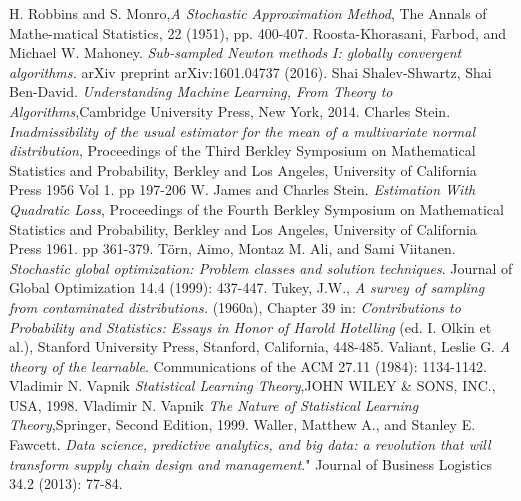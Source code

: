 \documentclass{book}
\theoremstyle{plain}
\theoremstyle{definition}
\theoremstyle{remark}
\begin{document}
\begin{thebibliography}{9}
H. Robbins and S. Monro,\emph{A  Stochastic  Approximation  Method}, The Annals of Mathe-matical Statistics, 22 (1951), pp. 400-407.
Roosta-Khorasani, Farbod, and Michael W. Mahoney. \emph{Sub-sampled Newton methods I: globally convergent algorithms.} arXiv preprint arXiv:1601.04737 (2016).
 Shai Shalev-Shwartz, Shai Ben-David. \emph{Understanding Machine Learning, From Theory to Algorithms},Cambridge University Press, New York, 2014.
 Charles Stein. \emph{Inadmissibility of the usual estimator for the mean of a multivariate normal distribution}, Proceedings of the Third Berkley Symposium on Mathematical Statistics and Probability, Berkley and Los Angeles, University of California Press 1956 Vol 1. pp 197-206
 W. James and Charles Stein. \emph{Estimation With Quadratic Loss},  Proceedings of the Fourth Berkley Symposium on Mathematical Statistics and Probability, Berkley and Los Angeles, University of California Press 1961. pp 361-379.
 Törn, Aimo, Montaz M. Ali, and Sami Viitanen. \emph{Stochastic global optimization: Problem classes and solution techniques}. Journal of Global Optimization 14.4 (1999): 437-447.
 Tukey, J.W., \emph{A survey of sampling from contaminated distributions.} (1960a), Chapter 39 in: \emph{Contributions to Probability and Statistics: Essays in Honor of Harold Hotelling} (ed. I. Olkin et al.), Stanford University Press, Stanford, California, 448-485.
 Valiant, Leslie G. \emph{A theory of the learnable}. Communications of the ACM 27.11 (1984): 1134-1142.
 Vladimir N. Vapnik  \emph{Statistical Learning Theory},JOHN WILEY \& SONS, INC., USA, 1998.
 Vladimir N. Vapnik  \emph{The Nature of Statistical Learning Theory},Springer, Second Edition, 1999.
 Waller, Matthew A., and Stanley E. Fawcett. \emph{Data science, predictive analytics, and big data: a revolution that will transform supply chain design and management}." Journal of Business Logistics 34.2 (2013): 77-84.

\end{thebibliography}
\end{document}
